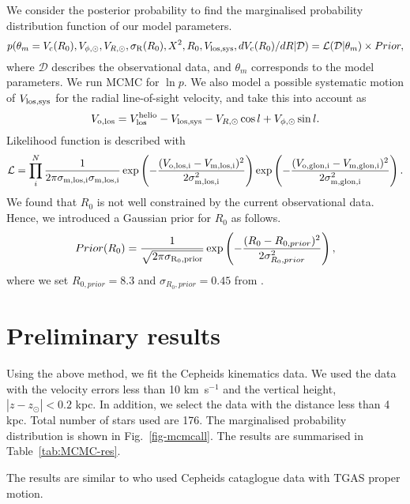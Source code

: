 \documentclass[11pt,a4paper]{article}
\begin{document}
We consider the posterior probability to find the marginalised probability distribution function of our model parameters.
\begin{equation}
 p(\theta_m=V_{\rm c}(R_0), V_{\phi,\odot}, V_{R,\odot}, \sigma_{\rm R}(R_0), X^2, R_0, V_{\rm los,sys}, dV_{\rm c}(R_0)/dR| \mathcal{D})
 = \mathcal L(\mathcal{D}|\theta_m) \times Prior,
\end{equation} 
where $\mathcal{D}$ describes the observational data, and $\theta_m$ corresponds to the model parameters. We run MCMC for $\ln p$. We also model a possible systematic motion of $V_{\rm los,sys}$ for the radial line-of-sight velocity, and take this into account as
\begin{equation}
V_{\rm o,los} = V_{\rm los}^{\rm helio}-V_{\rm los,sys} - V_{R,\odot} \cos l + V_{\rm \phi,\odot} \sin l.
\end{equation}
Likelihood function is described with 
\begin{equation}
\mathcal{L}=\prod_i^N \frac{1}{2 \pi \sigma_{\rm m,los,i} \sigma_{\rm m,los,i}} 
 \exp\left(-\frac{(V_{\rm o,los,i}-V_{\rm m,los,i})^2}{2 \sigma_{\rm m,los,i}^2}\right)
  \exp\left(-\frac{(V_{\rm o,glon,i}-V_{\rm m,glon,i})^2}{2 \sigma_{\rm m,glon,i}^2}\right).
\end{equation}
We found that $R_0$ is not well constrained by the current observational data. Hence, we introduced a Gaussian prior for $R_0$ as follows.
\begin{equation}
 Prior(R_0)= \frac{1}{\sqrt{2 \pi \sigma_{\rm R_0,prior}}}  \exp\left(-\frac{(R_0-R_{0,prior})^2}{2 \sigma_{R_0,prior}^2}\right),
\end{equation}
where we set $R_{0,prior}=8.3$ and $\sigma_{R_0,prior}=0.45$ from \citep{rdggb16}.

\section{Preliminary results}

Using the above method, we fit the Cepheids kinematics data. We used the data with the velocity errors less than 10 km~s$^{-1}$ and the vertical height, $|z-z_{\odot}|<0.2$ kpc. In addition, we select the data with the distance less than 4 kpc. Total number of stars used are 176.  The marginalised probability distribution is shown in Fig.~\ref{fig-mcmcall}. The results are summarised in Table~\ref{tab:MCMC-res}.

The results are similar to \citet{vvb17a} who used Cepheids cataglogue data with TGAS proper motion. 
\end{document}
